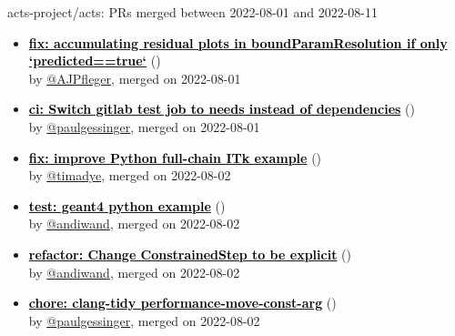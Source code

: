 \begin{frame}[allowframebreaks]{ acts-project/acts: PRs merged 
between 2022-08-01 and 2022-08-11
}

  \begin{itemize}
    
    \item\prmerged\textbf{\href{https://github.com/acts-project/acts/pull/1355}{\textcolor{black}{fix: accumulating residual plots in boundParamResolution if only `predicted==true`}}}
    (\href{https://github.com/acts-project/acts/pull/1355}{}) \\
    by \href{https://github.com/AJPfleger}{@AJPfleger}, merged on 2022-08-01

    \item\prmerged\textbf{\href{https://github.com/acts-project/acts/pull/1349}{\textcolor{black}{ci: Switch gitlab test job to needs instead of dependencies}}}
    (\href{https://github.com/acts-project/acts/pull/1349}{}) \\
    by \href{https://github.com/paulgessinger}{@paulgessinger}, merged on 2022-08-01

    \item\prmerged\textbf{\href{https://github.com/acts-project/acts/pull/1356}{\textcolor{black}{fix: improve Python full-chain ITk example}}}
    (\href{https://github.com/acts-project/acts/pull/1356}{}) \\
    by \href{https://github.com/timadye}{@timadye}, merged on 2022-08-02

    \item\prmerged\textbf{\href{https://github.com/acts-project/acts/pull/1334}{\textcolor{black}{test: geant4 python example}}}
    (\href{https://github.com/acts-project/acts/pull/1334}{}) \\
    by \href{https://github.com/andiwand}{@andiwand}, merged on 2022-08-02

    \item\prmerged\textbf{\href{https://github.com/acts-project/acts/pull/1347}{\textcolor{black}{refactor: Change ConstrainedStep to be explicit}}}
    (\href{https://github.com/acts-project/acts/pull/1347}{}) \\
    by \href{https://github.com/andiwand}{@andiwand}, merged on 2022-08-02

    \item\prmerged\textbf{\href{https://github.com/acts-project/acts/pull/1359}{\textcolor{black}{chore: clang-tidy performance-move-const-arg}}}
    (\href{https://github.com/acts-project/acts/pull/1359}{}) \\
    by \href{https://github.com/paulgessinger}{@paulgessinger}, merged on 2022-08-02


\end{itemize}
\end{frame}
